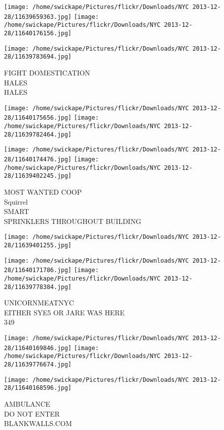 \documentclass[10pt,letterpaper]{article}
\begin{document}
\texttt{[image: /home/swickape/Pictures/flickr/Downloads/NYC 2013-12-28/11639659363.jpg]}
\texttt{[image: /home/swickape/Pictures/flickr/Downloads/NYC 2013-12-28/11640176156.jpg]}

\vspace{0.25in}
\texttt{[image: /home/swickape/Pictures/flickr/Downloads/NYC 2013-12-28/11639783694.jpg]}

FIGHT DOMESTICATION\\
HALES\\
HALES
\pagebreak

\texttt{[image: /home/swickape/Pictures/flickr/Downloads/NYC 2013-12-28/11640175656.jpg]}
\texttt{[image: /home/swickape/Pictures/flickr/Downloads/NYC 2013-12-28/11639782464.jpg]}

\texttt{[image: /home/swickape/Pictures/flickr/Downloads/NYC 2013-12-28/11640174476.jpg]}
\texttt{[image: /home/swickape/Pictures/flickr/Downloads/NYC 2013-12-28/11639402245.jpg]}

MOST WANTED COOP\\
Squirrel\\
SMART\\
SPRINKLERS THROUGHOUT BUILDING
\pagebreak

\texttt{[image: /home/swickape/Pictures/flickr/Downloads/NYC 2013-12-28/11639401255.jpg]}

\vspace{0.25in}
\texttt{[image: /home/swickape/Pictures/flickr/Downloads/NYC 2013-12-28/11640171786.jpg]}
\texttt{[image: /home/swickape/Pictures/flickr/Downloads/NYC 2013-12-28/11639778384.jpg]}

UNICORNMEATNYC\\
EITHER SYE5 OR JARE WAS HERE\\
349
\pagebreak

\texttt{[image: /home/swickape/Pictures/flickr/Downloads/NYC 2013-12-28/11640169846.jpg]}
\texttt{[image: /home/swickape/Pictures/flickr/Downloads/NYC 2013-12-28/11639776674.jpg]}

\vspace{0.25in}
\texttt{[image: /home/swickape/Pictures/flickr/Downloads/NYC 2013-12-28/11640168596.jpg]}

AMBULANCE\\
DO NOT ENTER\\
BLANKWALLS.COM
\pagebreak
\end{document}

